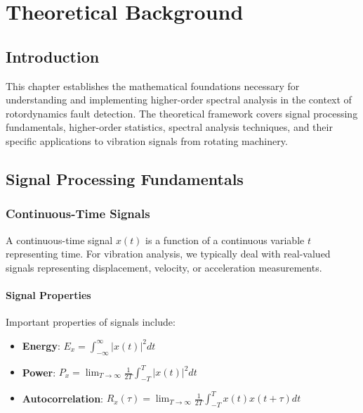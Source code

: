
\chapter{Theoretical Background}

\section{Introduction}

This chapter establishes the mathematical foundations necessary for understanding and implementing higher-order spectral analysis in the context of rotordynamics fault detection. The theoretical framework covers signal processing fundamentals, higher-order statistics, spectral analysis techniques, and their specific applications to vibration signals from rotating machinery.

\section{Signal Processing Fundamentals}

\subsection{Continuous-Time Signals}

A continuous-time signal $x(t)$ is a function of a continuous variable $t$ representing time. For vibration analysis, we typically deal with real-valued signals representing displacement, velocity, or acceleration measurements.

\subsubsection{Signal Properties}

Important properties of signals include:

\begin{itemize}
    \item \textbf{Energy}: $E_x = \int_{-\infty}^{\infty} |x(t)|^2 dt$
    \item \textbf{Power}: $P_x = \lim_{T \to \infty} \frac{1}{2T} \int_{-T}^{T} |x(t)|^2 dt$
    \item \textbf{Autocorrelation}: $R_x(\tau) = \lim_{T \to \infty} \frac{1}{2T} \int_{-T}^{T} x(t)x(t+\tau) dt$
\end{itemize}

